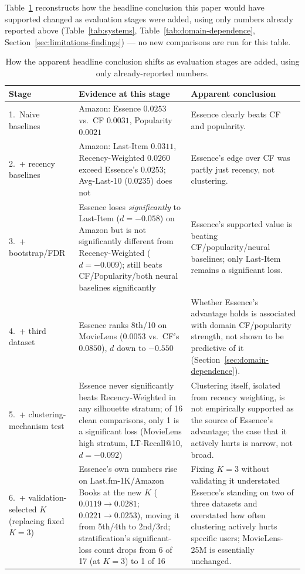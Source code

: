\documentclass{article}
\begin{document}
Table~\ref{tab:claimreversal} reconstructs how the headline conclusion this paper would have supported changed as evaluation stages were added, using only numbers already reported above (Table~\ref{tab:systems}, Table~\ref{tab:domain-dependence}, Section~\ref{sec:limitations-findings}) --- no new comparisons are run for this table.

\begin{table}[H]
\centering
\caption{How the apparent headline conclusion shifts as evaluation stages are added, using only already-reported numbers.}
\label{tab:claimreversal}
\scriptsize
\begin{tabular}{p{2.1cm}p{4.3cm}p{5.4cm}}
\toprule
\textbf{Stage} & \textbf{Evidence at this stage} & \textbf{Apparent conclusion} \\
\midrule
1.\ Naive baselines & Amazon: Essence $0.0253$ vs.\ CF $0.0031$, Popularity $0.0021$ & Essence clearly beats CF and popularity. \\
\midrule
2.\ + recency baselines & Amazon: Last-Item $0.0311$, Recency-Weighted $0.0260$ exceed Essence's $0.0253$; Avg-Last-10 ($0.0235$) does not & Essence's edge over CF was partly just recency, not clustering. \\
\midrule
3.\ + bootstrap/FDR & Essence loses \emph{significantly} to Last-Item ($d=-0.058$) on Amazon but is not significantly different from Recency-Weighted ($d=-0.009$); still beats CF/Popularity/both neural baselines significantly & Essence's supported value is beating CF/popularity/neural baselines; only Last-Item remains a significant loss. \\
\midrule
4.\ + third dataset & Essence ranks 8th/10 on MovieLens ($0.0053$ vs.\ CF's $0.0850$), $d$ down to $-0.550$ & Whether Essence's advantage holds is associated with domain CF/popularity strength, not shown to be predictive of it (Section~\ref{sec:domain-dependence}). \\
\midrule
5.\ + clustering-mechanism test & Essence never significantly beats Recency-Weighted in any silhouette stratum; of 16 clean comparisons, only 1 is a significant loss (MovieLens high stratum, LT-Recall@10, $d=-0.092$) & Clustering itself, isolated from recency weighting, is not empirically supported as the source of Essence's advantage; the case that it actively hurts is narrow, not broad. \\
\midrule
6.\ + validation-selected $K$ (replacing fixed $K{=}3$) & Essence's own numbers rise on Last.fm-1K/Amazon Books at the new $K$ ($0.0119\to0.0281$; $0.0221\to0.0253$), moving it from 5th/4th to 2nd/3rd; stratification's significant-loss count drops from 6 of 17 (at $K{=}3$) to 1 of 16 & Fixing $K=3$ without validating it understated Essence's standing on two of three datasets and overstated how often clustering actively hurts specific users; MovieLens-25M is essentially unchanged. \\
\bottomrule
\end{tabular}
\end{table}
\end{document}
